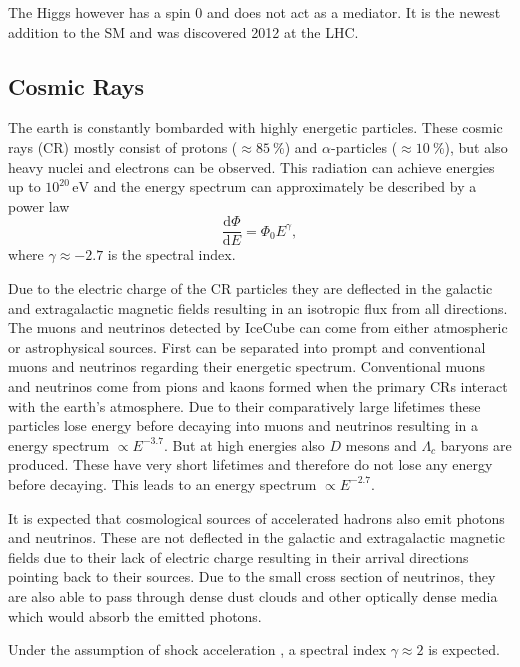 The Higgs however has a spin $0$ and does not act as a mediator. It is the newest addition to the SM and was discovered 2012 at the LHC\cite{ATLAS:2012yve}. 

\subsection{Cosmic Rays}
The earth is constantly bombarded with highly energetic particles. These cosmic rays (CR) mostly consist of protons ($\approx \SI{85}{\percent}$) and $\alpha$-particles ($\approx \SI{10}{\percent}$), but also heavy nuclei and electrons can be observed. This radiation can achieve energies up to $10^{20}\,\si{\electronvolt}$ and the energy spectrum can approximately be described by a power law
\begin{equation}
  \frac{\mathrm{d}\Phi}{\mathrm{d}E} = \Phi_0 E^{\gamma},
\end{equation}
where $\gamma \approx - 2.7$ is the spectral index.

Due to the electric charge of the CR particles they are deflected in the galactic and extragalactic magnetic fields resulting in an isotropic flux from all directions.\\

The muons and neutrinos detected by IceCube can come from either atmospheric or astrophysical sources. First can be separated into prompt and conventional muons and neutrinos regarding their energetic spectrum. Conventional muons and neutrinos come from pions and kaons formed when the primary CRs interact with the earth's atmosphere. Due to their comparatively large lifetimes these particles lose energy before decaying into muons and neutrinos resulting in a energy spectrum $\propto E^{-3.7}$. But at high energies also $D$ mesons and $\Lambda_c$ baryons are produced. These have very short lifetimes and therefore do not lose any energy before decaying. This leads to an energy spectrum $\propto E^{-2.7}$.

It is expected that cosmological sources of accelerated hadrons also emit photons and neutrinos. These are not deflected in the galactic and extragalactic magnetic fields due to their lack of electric charge resulting in their arrival directions pointing back to their sources. Due to the small cross section of neutrinos, they are also able to pass through dense dust clouds and other optically dense media which would absorb the emitted photons.

Under the assumption of shock acceleration \cite{Fermi}, a spectral index $\gamma \approx 2$ is expected.
